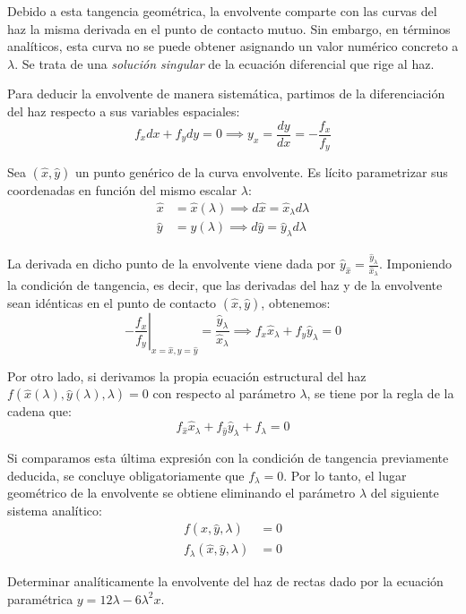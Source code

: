 \begin{observacion}
Debido a esta tangencia geométrica, la envolvente comparte con las curvas del haz la misma derivada en el punto de contacto mutuo. Sin embargo, en términos analíticos, esta curva no se puede obtener asignando un valor numérico concreto a $\lambda$. Se trata de una \textit{solución singular} de la ecuación diferencial que rige al haz.
\end{observacion}

Para deducir la envolvente de manera sistemática, partimos de la diferenciación del haz respecto a sus variables espaciales:
$$ f_x dx + f_y dy = 0 \implies y_x = \frac{dy}{dx} = -\frac{f_x}{f_y} $$

Sea $(\hat{x}, \hat{y})$ un punto genérico de la curva envolvente. Es lícito parametrizar sus coordenadas en función del mismo escalar $\lambda$:
\begin{align*}
    \hat{x} &= \hat{x}(\lambda) \implies d\hat{x} = \hat{x}_\lambda d\lambda \\
    \hat{y} &= \hat{y}(\lambda) \implies d\hat{y} = \hat{y}_\lambda d\lambda
\end{align*}

La derivada en dicho punto de la envolvente viene dada por $\hat{y}_{\hat{x}} = \frac{\hat{y}_\lambda}{\hat{x}_\lambda}$. Imponiendo la condición de tangencia, es decir, que las derivadas del haz y de la envolvente sean idénticas en el punto de contacto $(\hat{x}, \hat{y})$, obtenemos:
$$ -\left.\frac{f_x}{f_y}\right|_{x=\hat{x}, y=\hat{y}} = \frac{\hat{y}_\lambda}{\hat{x}_\lambda} \implies f_x \hat{x}_\lambda + f_y \hat{y}_\lambda = 0 $$

Por otro lado, si derivamos la propia ecuación estructural del haz $f(\hat{x}(\lambda), \hat{y}(\lambda), \lambda) = 0$ con respecto al parámetro $\lambda$, se tiene por la regla de la cadena que:
$$ f_{\hat{x}} \hat{x}_\lambda + f_{\hat{y}} \hat{y}_\lambda + f_\lambda = 0 $$

Si comparamos esta última expresión con la condición de tangencia previamente deducida, se concluye obligatoriamente que $f_\lambda = 0$. Por lo tanto, el lugar geométrico de la envolvente se obtiene eliminando el parámetro $\lambda$ del siguiente sistema analítico:
\begin{align*}
    f(\hat{x}, \hat{y}, \lambda) &= 0 \\
    f_\lambda(\hat{x}, \hat{y}, \lambda) &= 0
\end{align*}

\vspace{0.4cm}
\begin{ejercicio}
Determinar analíticamente la envolvente del haz de rectas dado por la ecuación paramétrica $y = 12\lambda - 6\lambda^2 x$.
\end{ejercicio}

